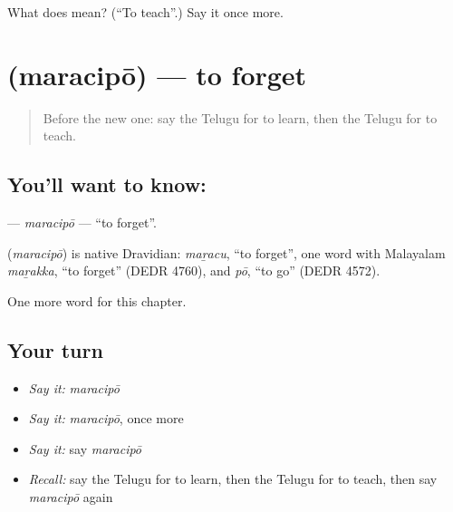 \begin{tcolorbox}[breakable,colback=teal!4,colframe=teal!35!black,title={Before you move on}]
What does  mean? (\textquotedblleft{}To teach\textquotedblright{}.) Say it once more.
\end{tcolorbox}
\section[\texorpdfstring{\te{మరచిపో} (maracipō)}{మరచిపో (maracipō)}]{ (maracipō) — to forget}

\label{lesson:TE-C145-maracipo}



\begin{quote}
Before the new one: say the Telugu for to learn, then the Telugu for to teach.
\end{quote}

\subsection*{You'll want to know: }
\textbf{} — \emph{maracipō} — \textquotedblleft{}to forget\textquotedblright{}.

\begin{cousinweb}
\textbf{} (\emph{maracipō}) is native Dravidian: \emph{maṟacu}, \textquotedblleft{}to forget\textquotedblright{}, one word with Malayalam \emph{maṟakka}, \textquotedblleft{}to forget\textquotedblright{} (DEDR 4760), and \emph{pō}, \textquotedblleft{}to go\textquotedblright{} (DEDR 4572).
\end{cousinweb}

\begin{grammarlens}[title={What you've built}]
One more word for this chapter.
\end{grammarlens}

\subsection*{Your turn}
\begin{itemize}
\raggedright
  \item \emph{Say it:} \emph{maracipō}
  \item \emph{Say it:} \emph{maracipō}, once more
  \item \emph{Say it:} say \emph{maracipō}
  \item \emph{Recall:} say the Telugu for to learn, then the Telugu for to teach, then say \emph{maracipō} again
\end{itemize}

